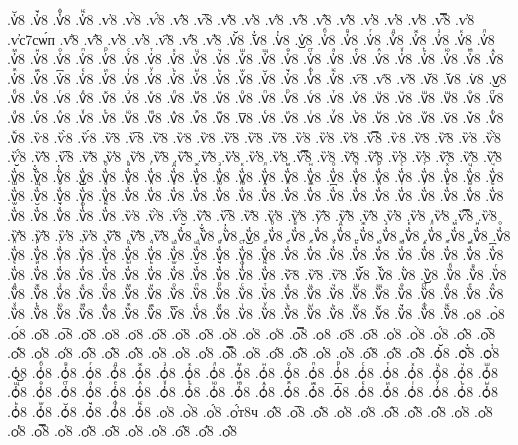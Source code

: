 {.ѵ҅꙼8
.ѵ҅꙽8
.ѵ҅ꚞ8
.ѵ҅ꚟ8
.ѵ҆8
.ѵ҆̀8
.ѵ҆́8
.ѵ҆̂8
.ѵ҆̅8
.ѵ҆̆8
.ѵ҆̇8
.ѵ҆̈8
.ѵ҆̋8
.ѵ҆̏8
.ѵ҆̑8
.ѵ҆̓8
.ѵ҆̔8
.ѵ҆̾8
.ѵ҆̿8
.ѵ҆͘8
.ѵ҆с7сѡ́п
.ѵ҆҃8
.ѵ҆҄8
.ѵ҆҅8
.ѵ҆҆8
.ѵ҆҇8
.ѵ҆᷀8
.ѵ҆᷁8
.ѵ҆᷶8
.ѵ᷷҆8
.ѵ᷸҆8
.ѵ᷹҆8
.ѵ҆ⷠ8
.ѵ҆ⷡ8
.ѵ҆ⷢ8
.ѵ҆ⷣ8
.ѵ҆ⷤ8
.ѵ҆ⷥ8
.ѵ҆ⷦ8
.ѵ҆ⷧ8
.ѵ҆ⷨ8
.ѵ҆ⷩ8
.ѵ҆ⷪ8
.ѵ҆ⷫ8
.ѵ҆ⷬ8
.ѵ҆ⷭ8
.ѵ҆ⷮ8
.ѵ҆ⷯ8
.ѵ҆ⷰ8
.ѵ҆ⷱ8
.ѵ҆ⷲ8
.ѵ҆ⷳ8
.ѵ҆ⷴ8
.ѵ҆ⷵ8
.ѵ҆ⷶ8
.ѵ҆ⷷ8
.ѵ҆ⷸ8
.ѵ҆ⷹ8
.ѵ҆ⷺ8
.ѵ҆ⷻ8
.ѵ҆ⷼ8
.ѵ҆ⷽ8
.ѵ҆ⷾ8
.ѵ҆ⷿ8
.ѵ҆꙯8
.ѵ҆ꙴ8
.ѵ҆ꙵ8
.ѵ҆ꙶ8
.ѵ҆ꙷ8
.ѵ҆ꙸ8
.ѵ҆ꙹ8
.ѵ҆ꙺ8
.ѵ҆ꙻ8
.ѵ҆꙼8
.ѵ҆꙽8
.ѵ҆ꚞ8
.ѵ҆ꚟ8
.ѵ҇8
.ѵ᷀8
.ѵ᷁8
.ѵ᷶8
.ѵ᷷8
.ѵ᷸8
.ѵ᷹8
.ѵⷠ8
.ѵⷡ8
.ѵⷢ8
.ѵⷣ8
.ѵⷤ8
.ѵⷥ8
.ѵⷦ8
.ѵⷧ8
.ѵⷨ8
.ѵⷩ8
.ѵⷪ8
.ѵⷫ8
.ѵⷬ8
.ѵⷭ8
.ѵⷮ8
.ѵⷯ8
.ѵⷰ8
.ѵⷱ8
.ѵⷲ8
.ѵⷳ8
.ѵⷴ8
.ѵⷵ8
.ѵⷶ8
.ѵⷷ8
.ѵⷸ8
.ѵⷹ8
.ѵⷺ8
.ѵⷻ8
.ѵⷼ8
.ѵⷽ8
.ѵⷾ8
.ѵⷿ8
.ѵ꙯8
.ѵꙴ8
.ѵꙵ8
.ѵꙶ8
.ѵꙷ8
.ѵꙸ8
.ѵꙹ8
.ѵꙺ8
.ѵꙻ8
.ѵ꙼8
.ѵ꙽8
.ѵꚞ8
.ѵꚟ8
.ѷ8
.ѷ̀8
.ѷ́8
.ѷ̂8
.ѷ̅8
.ѷ̆8
.ѷ̇8
.ѷ̈8
.ѷ̋8
.ѷ̏8
.ѷ̑8
.ѷ̓8
.ѷ̔8
.ѷ̾8
.ѷ̿8
.ѷ͘8
.ѷ҃8
.ѷ҄8
.ѷ҅8
.ѷ҅̀8
.ѷ҅́8
.ѷ҅̂8
.ѷ҅̅8
.ѷ҅̆8
.ѷ҅̇8
.ѷ҅̈8
.ѷ҅̋8
.ѷ҅̏8
.ѷ҅̑8
.ѷ҅̓8
.ѷ҅̔8
.ѷ҅̾8
.ѷ҅̿8
.ѷ҅͘8
.ѷ҅҃8
.ѷ҅҄8
.ѷ҅҅8
.ѷ҅҆8
.ѷ҅҇8
.ѷ҅᷀8
.ѷ҅᷁8
.ѷ҅᷶8
.ѷ᷷҅8
.ѷ᷸҅8
.ѷ᷹҅8
.ѷ҅ⷠ8
.ѷ҅ⷡ8
.ѷ҅ⷢ8
.ѷ҅ⷣ8
.ѷ҅ⷤ8
.ѷ҅ⷥ8
.ѷ҅ⷦ8
.ѷ҅ⷧ8
.ѷ҅ⷨ8
.ѷ҅ⷩ8
.ѷ҅ⷪ8
.ѷ҅ⷫ8
.ѷ҅ⷬ8
.ѷ҅ⷭ8
.ѷ҅ⷮ8
.ѷ҅ⷯ8
.ѷ҅ⷰ8
.ѷ҅ⷱ8
.ѷ҅ⷲ8
.ѷ҅ⷳ8
.ѷ҅ⷴ8
.ѷ҅ⷵ8
.ѷ҅ⷶ8
.ѷ҅ⷷ8
.ѷ҅ⷸ8
.ѷ҅ⷹ8
.ѷ҅ⷺ8
.ѷ҅ⷻ8
.ѷ҅ⷼ8
.ѷ҅ⷽ8
.ѷ҅ⷾ8
.ѷ҅ⷿ8
.ѷ҅꙯8
.ѷ҅ꙴ8
.ѷ҅ꙵ8
.ѷ҅ꙶ8
.ѷ҅ꙷ8
.ѷ҅ꙸ8
.ѷ҅ꙹ8
.ѷ҅ꙺ8
.ѷ҅ꙻ8
.ѷ҅꙼8
.ѷ҅꙽8
.ѷ҅ꚞ8
.ѷ҅ꚟ8
.ѷ҆8
.ѷ҆̀8
.ѷ҆́8
.ѷ҆̂8
.ѷ҆̅8
.ѷ҆̆8
.ѷ҆̇8
.ѷ҆̈8
.ѷ҆̋8
.ѷ҆̏8
.ѷ҆̑8
.ѷ҆̓8
.ѷ҆̔8
.ѷ҆̾8
.ѷ҆̿8
.ѷ҆͘8
.ѷ҆҃8
.ѷ҆҄8
.ѷ҆҅8
.ѷ҆҆8
.ѷ҆҇8
.ѷ҆᷀8
.ѷ҆᷁8
.ѷ҆᷶8
.ѷ᷷҆8
.ѷ᷸҆8
.ѷ᷹҆8
.ѷ҆ⷠ8
.ѷ҆ⷡ8
.ѷ҆ⷢ8
.ѷ҆ⷣ8
.ѷ҆ⷤ8
.ѷ҆ⷥ8
.ѷ҆ⷦ8
.ѷ҆ⷧ8
.ѷ҆ⷨ8
.ѷ҆ⷩ8
.ѷ҆ⷪ8
.ѷ҆ⷫ8
.ѷ҆ⷬ8
.ѷ҆ⷭ8
.ѷ҆ⷮ8
.ѷ҆ⷯ8
.ѷ҆ⷰ8
.ѷ҆ⷱ8
.ѷ҆ⷲ8
.ѷ҆ⷳ8
.ѷ҆ⷴ8
.ѷ҆ⷵ8
.ѷ҆ⷶ8
.ѷ҆ⷷ8
.ѷ҆ⷸ8
.ѷ҆ⷹ8
.ѷ҆ⷺ8
.ѷ҆ⷻ8
.ѷ҆ⷼ8
.ѷ҆ⷽ8
.ѷ҆ⷾ8
.ѷ҆ⷿ8
.ѷ҆꙯8
.ѷ҆ꙴ8
.ѷ҆ꙵ8
.ѷ҆ꙶ8
.ѷ҆ꙷ8
.ѷ҆ꙸ8
.ѷ҆ꙹ8
.ѷ҆ꙺ8
.ѷ҆ꙻ8
.ѷ҆꙼8
.ѷ҆꙽8
.ѷ҆ꚞ8
.ѷ҆ꚟ8
.ѷ҇8
.ѷ᷀8
.ѷ᷁8
.ѷ᷶8
.ѷ᷷8
.ѷ᷸8
.ѷ᷹8
.ѷⷠ8
.ѷⷡ8
.ѷⷢ8
.ѷⷣ8
.ѷⷤ8
.ѷⷥ8
.ѷⷦ8
.ѷⷧ8
.ѷⷨ8
.ѷⷩ8
.ѷⷪ8
.ѷⷫ8
.ѷⷬ8
.ѷⷭ8
.ѷⷮ8
.ѷⷯ8
.ѷⷰ8
.ѷⷱ8
.ѷⷲ8
.ѷⷳ8
.ѷⷴ8
.ѷⷵ8
.ѷⷶ8
.ѷⷷ8
.ѷⷸ8
.ѷⷹ8
.ѷⷺ8
.ѷⷻ8
.ѷⷼ8
.ѷⷽ8
.ѷⷾ8
.ѷⷿ8
.ѷ꙯8
.ѷꙴ8
.ѷꙵ8
.ѷꙶ8
.ѷꙷ8
.ѷꙸ8
.ѷꙹ8
.ѷꙺ8
.ѷꙻ8
.ѷ꙼8
.ѷ꙽8
.ѷꚞ8
.ѷꚟ8
.ѻ8
.ѻ̀8
.ѻ́8
.ѻ̂8
.ѻ̅8
.ѻ̆8
.ѻ̇8
.ѻ̈8
.ѻ̋8
.ѻ̏8
.ѻ̑8
.ѻ̓8
.ѻ̔8
.ѻ̾8
.ѻ̿8
.ѻ͘8
.ѻ҃8
.ѻ҄8
.ѻ҅8
.ѻ҅̀8
.ѻ҅́8
.ѻ҅̂8
.ѻ҅̅8
.ѻ҅̆8
.ѻ҅̇8
.ѻ҅̈8
.ѻ҅̋8
.ѻ҅̏8
.ѻ҅̑8
.ѻ҅̓8
.ѻ҅̔8
.ѻ҅̾8
.ѻ҅̿8
.ѻ҅͘8
.ѻ҅҃8
.ѻ҅҄8
.ѻ҅҅8
.ѻ҅҆8
.ѻ҅҇8
.ѻ҅᷀8
.ѻ҅᷁8
.ѻ҅᷶8
.ѻ᷷҅8
.ѻ᷸҅8
.ѻ᷹҅8
.ѻ҅ⷠ8
.ѻ҅ⷡ8
.ѻ҅ⷢ8
.ѻ҅ⷣ8
.ѻ҅ⷤ8
.ѻ҅ⷥ8
.ѻ҅ⷦ8
.ѻ҅ⷧ8
.ѻ҅ⷨ8
.ѻ҅ⷩ8
.ѻ҅ⷪ8
.ѻ҅ⷫ8
.ѻ҅ⷬ8
.ѻ҅ⷭ8
.ѻ҅ⷮ8
.ѻ҅ⷯ8
.ѻ҅ⷰ8
.ѻ҅ⷱ8
.ѻ҅ⷲ8
.ѻ҅ⷳ8
.ѻ҅ⷴ8
.ѻ҅ⷵ8
.ѻ҅ⷶ8
.ѻ҅ⷷ8
.ѻ҅ⷸ8
.ѻ҅ⷹ8
.ѻ҅ⷺ8
.ѻ҅ⷻ8
.ѻ҅ⷼ8
.ѻ҅ⷽ8
.ѻ҅ⷾ8
.ѻ҅ⷿ8
.ѻ҅꙯8
.ѻ҅ꙴ8
.ѻ҅ꙵ8
.ѻ҅ꙶ8
.ѻ҅ꙷ8
.ѻ҅ꙸ8
.ѻ҅ꙹ8
.ѻ҅ꙺ8
.ѻ҅ꙻ8
.ѻ҅꙼8
.ѻ҅꙽8
.ѻ҅ꚞ8
.ѻ҅ꚟ8
.ѻ҆8
.ѻ҆̀8
.ѻ҆́8
.ѻ҆́т8ч
.ѻ҆̂8
.ѻ҆̅8
.ѻ҆̆8
.ѻ҆̇8
.ѻ҆̈8
.ѻ҆̋8
.ѻ҆̏8
.ѻ҆̑8
.ѻ҆̓8
.ѻ҆̔8
.ѻ҆̾8
.ѻ҆̿8
.ѻ҆͘8
.ѻ҆҃8
.ѻ҆҄8
.ѻ҆҅8
.ѻ҆҆8
.ѻ҆҇8
.ѻ҆᷀8
.ѻ҆᷁8
}
